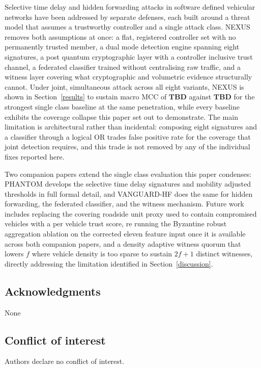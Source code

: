 \documentclass[lettersize,journal]{IEEEtran}
\theoremstyle{plain}
\theoremstyle{remark}
\newcommand{\TBD}{\textbf{TBD}} %
\begin{document}
	Selective time delay and hidden forwarding attacks in software defined
	vehicular networks have been addressed by separate defenses, each built
	around a threat model that assumes a trustworthy controller and a
	single attack class. NEXUS removes both assumptions at once: a flat,
	registered controller set with no permanently trusted member, a dual
	mode detection engine spanning eight signatures, a post quantum
	cryptographic layer with a controller inclusive trust channel, a
	federated classifier trained without centralising raw traffic, and a
	witness layer covering what cryptographic and volumetric evidence
	structurally cannot. Under joint, simultaneous attack across all eight
	variants, NEXUS is shown in Section~\ref{results} to sustain macro MCC
	of $\TBD$ against $\TBD$ for the strongest single class baseline at
	the same penetration, while every baseline exhibits the coverage
	collapse this paper set out to demonstrate. The main limitation is
	architectural rather than incidental: composing eight signatures and a
	classifier through a logical OR trades false positive rate for the
	coverage that joint detection requires, and this trade is not removed
	by any of the individual fixes reported here.
	
	Two companion papers extend the single class evaluation this paper
	condenses: PHANTOM develops the selective time delay signatures and
	mobility adjusted thresholds in full formal detail, and VANGUARD-HF
	does the same for hidden forwarding, the federated classifier, and the
	witness mechanism. Future work includes replacing the covering roadside
	unit proxy used to contain compromised vehicles with a per vehicle
	trust score, re running the Byzantine robust aggregation ablation on
	the corrected eleven feature input once it is available across both
	companion papers, and a density adaptive witness quorum that lowers
	$f$ where vehicle density is too sparse to sustain $2f{+}1$ distinct
	witnesses, directly addressing the limitation identified in
	Section~\ref{discussion}.
	
	\subsection{Acknowledgments}
	None
	
	\subsection{Conflict of interest}
	\noindent Authors declare no conflict of interest.
	
\end{document}
